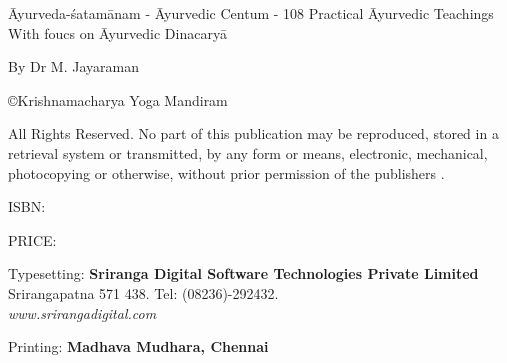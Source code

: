 \thispagestyle{empty}

Āyurveda-śatamānam - Āyurvedic Centum - 108 Practical Āyurvedic Teachings With foucs on Āyurvedic Dinacaryā

By Dr M. Jayaraman 

\copyright{Krishnamacharya Yoga Mandiram}

All Rights Reserved. No part of this publication may be reproduced, stored in a retrieval system or transmitted, by any form or means, electronic, mechanical, photocopying or otherwise, without prior permission of the publishers . 

ISBN: 

PRICE:

Typesetting: \textbf{Sriranga Digital Software Technologies Private Limited}\\ Srirangapatna 571 438. Tel: (08236)-292432.\\ \textit{www.srirangadigital.com}

Printing: \textbf{Madhava Mudhara, Chennai}
